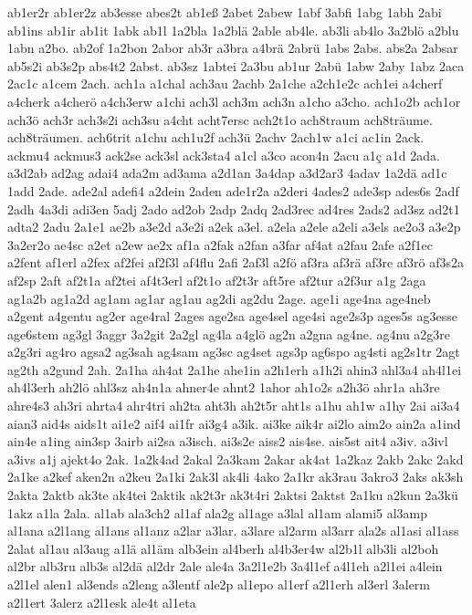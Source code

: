 {ab1er2r
ab1er2z
ab3esse
abes2t
ab1eß
2abet
2abew
1abf
3abfi
1abg
1abh
2abi
ab1ins
ab1ir
ab1it
1abk
ab1l
1a2bla
1a2blä
2able
ab4le.
ab3li
ab4lo
3a2blö
a2blu
1abn
a2bo.
ab2of
1a2bon
2abor
ab3r
a3bra
a4brä
2abrü
1abs
2abs.
abs2a
2absar
ab5s2i
ab3s2p
abs4t2
2abst.
ab3sz
1abtei
2a3bu
ab1ur
2abü
1abw
2aby
1abz
2aca
2ac1c
a1cem
2ach.
ach1a
a1chal
ach3au
2achb
2a1che
a2ch1e2c
ach1ei
a4cherf
a4cherk
a4cherö
a4ch3erw
a1chi
ach3l
ach3m
ach3n
a1cho
a3cho.
ach1o2b
ach1or
ach3ö
ach3r
ach3s2i
ach3su
a4cht
acht7ersc
ach2t1o
ach8traum
ach8träume.
ach8träumen.
ach6trit
a1chu
ach1u2f
ach3ü
2achv
2ach1w
a1ci
ac1in
2ack.
ackmu4
ackmus3
ack2se
ack3sl
ack3sta4
a1cl
a3co
acon4n
2acu
a1ç
a1d
2ada.
a3d2ab
ad2ag
adai4
ada2m
ad3ama
a2d1an
3a4dap
a3d2ar3
4adav
1a2dä
ad1c
1add
2ade.
ade2al
adefi4
a2dein
2aden
ade1r2a
a2deri
4ades2
ade3sp
ades6s
2adf
2adh
4a3di
adi3en
5adj
2ado
ad2ob
2adp
2adq
2ad3rec
ad4res
2ads2
ad3sz
ad2t1
adta2
2adu
2a1e1
ae2b
a3e2d
a3e2i
a2ek
a3el.
a2ela
a2ele
a2eli
a3els
ae2o3
a3e2p
3a2er2o
ae4sc
a2et
a2ew
ae2x
af1a
a2fak
a2fan
a3far
af4at
a2fau
2afe
a2f1ec
a2fent
af1erl
a2fex
af2fei
af2f3l
af4flu
2afi
2af3l
a2fö
af3ra
af3rä
af3re
af3rö
af3s2a
af2sp
2aft
af2t1a
af2tei
af4t3erl
af2t1o
af2t3r
aft5re
af2tur
a2f3ur
a1g
2aga
ag1a2b
ag1a2d
ag1am
ag1ar
ag1au
ag2di
ag2du
2age.
age1i
age4na
age4neb
a2gent
a4gentu
ag2er
age4ral
2ages
age2sa
age4sel
age4si
age2s3p
ages5s
ag3esse
age6stem
ag3gl
3aggr
3a2git
2a2gl
ag4la
a4glö
ag2n
a2gna
ag4ne.
ag4nu
a2g3re
a2g3ri
ag4ro
agsa2
ag3sah
ag4sam
ag3sc
ag4set
ags3p
ag6spo
ag4sti
ag2s1tr
2agt
ag2th
a2gund
2ah.
2a1ha
ah4at
2a1he
ahe1in
a2h1erh
a1h2i
ahin3
ahl3a4
ah4l1ei
ah4l3erh
ah2lö
ahl3sz
ah4n1a
ahner4e
ahnt2
1ahor
ah1o2s
a2h3ö
ahr1a
ah3re
ahre4s3
ah3ri
ahrta4
ahr4tri
ah2ta
aht3h
ah2t5r
aht1s
a1hu
ah1w
a1hy
2ai
ai3a4
aian3
aid4s
aids1t
ai1e2
aif4
ai1fr
ai3g4
a3ik.
ai3ke
aik4r
ai2lo
aim2o
ain2a
a1ind
ain4e
a1ing
ain3sp
3airb
ai2sa
a3isch.
ai3s2e
aiss2
ais4se.
ais5st
ait4
a3iv.
a3ivl
a3ivs
a1j
ajekt4o
2ak.
1a2k4ad
2akal
2a3kam
2akar
ak4at
1a2kaz
2akb
2akc
2akd
2a1ke
a2kef
aken2n
a2keu
2a1ki
2ak3l
ak4li
4ako
2a1kr
ak3rau
3akro3
2aks
ak3sh
2akta
2aktb
ak3te
ak4tei
2aktik
ak2t3r
ak3t4ri
2aktsi
2aktst
2a1ku
a2kun
2a3kü
1akz
a1la
2ala.
al1ab
ala3ch2
al1af
ala2g
al1age
a3lal
al1am
alami5
al3amp
al1ana
a2l1ang
al1ans
al1anz
a2lar
a3lar.
a3lare
al2arm
al3arr
ala2s
al1asi
al1ass
2alat
al1au
al3aug
a1lä
al1äm
alb3ein
al4berh
al4b3er4w
al2b1l
alb3li
al2boh
al2br
alb3ru
alb3s
al2dä
al2dr
2ale
ale4a
3a2l1e2b
3a4l1ef
a4l1eh
a2l1ei
a4lein
a2l1el
alen1
al3ends
a2leng
a3lentf
ale2p
al1epo
al1erf
a2l1erh
al3erl
3alerm
a2l1ert
3alerz
a2l1esk
ale4t
al1eta
}
